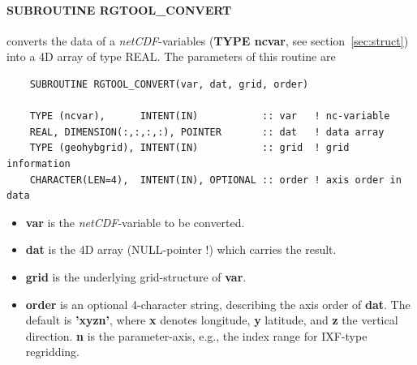 \documentclass[12pt, a4paper]{article}
\begin{document}
\paragraph{\bf SUBROUTINE RGTOOL\_CONVERT} converts the data
of a {\it netCDF}-variables ({\bf TYPE ncvar}, see section~\ref{sec:struct})
into a 4D array of type REAL. The parameters of this routine are
\begin{verbatim}
    SUBROUTINE RGTOOL_CONVERT(var, dat, grid, order)

    TYPE (ncvar),      INTENT(IN)           :: var   ! nc-variable
    REAL, DIMENSION(:,:,:,:), POINTER       :: dat   ! data array
    TYPE (geohybgrid), INTENT(IN)           :: grid  ! grid information
    CHARACTER(LEN=4),  INTENT(IN), OPTIONAL :: order ! axis order in data
\end{verbatim}
%
\begin{itemize}
\item {\bf var} is the {\it netCDF}-variable to be converted.
\item {\bf dat} is the 4D array (NULL-pointer !) which carries the result.
\item {\bf grid} is the underlying grid-structure of {\bf var}.
\item {\bf order} is an optional 4-character string, describing the axis
            order of {\bf dat}.
            The default is {\bf 'xyzn'}, where {\bf x} denotes longitude,
            {\bf y} latitude, and {\bf z} the
            vertical direction. {\bf n} is the parameter-axis, e.g., the index
            range for IXF-type regridding.
\end{itemize}

\end{document}

